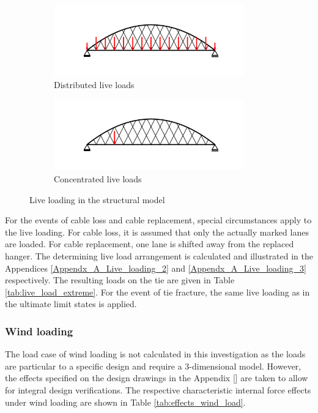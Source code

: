 \begin{figure}[H]
\centering
\begin{subfigure}{0.5\textwidth}
    \centering
    \includegraphics[trim={0 0.8cm 0 0.8cm},clip, width=0.9\textwidth]{illustrations/figures/distributed live loads.png}
    \caption{Distributed live loads}
    \label{fig:Live_load_1}
\end{subfigure}%
\begin{subfigure}{.5\textwidth}
    \centering
    \includegraphics[trim={0 0.8cm 0 0.8cm},clip, width=0.9\textwidth]{illustrations/figures/concentrated live loads.png}
    \caption{Concentrated live loads}
    \label{fig:Live_load_2}
\end{subfigure}
\caption{Live loading in the structural model}
\label{fig:Live_load}
\end{figure}

For the events of cable loss and cable replacement, special circumstances apply to the live loading. For cable loss, it is assumed that only the actually marked lanes are loaded. For cable replacement, one lane is shifted away from the replaced hanger. The determining live load arrangement is calculated and illustrated in the Appendices \ref{Appendx_A_Live_loading_2} and \ref{Appendx_A_Live_loading_3} respectively. The resulting loads on the tie are given in Table \ref{tab:live_load_extreme}. For the event of tie fracture, the same live loading as in the ultimate limit states is applied.




\subsubsection{Wind loading}
The load case of wind loading is not calculated in this investigation as the loads are particular to a specific design and require a 3-dimensional model. However, the effects specified on the design drawings in the Appendix [] are taken to allow for integral design verifications. The respective characteristic internal force effects under wind loading are shown in Table \ref{tab:effects_wind_load}.

